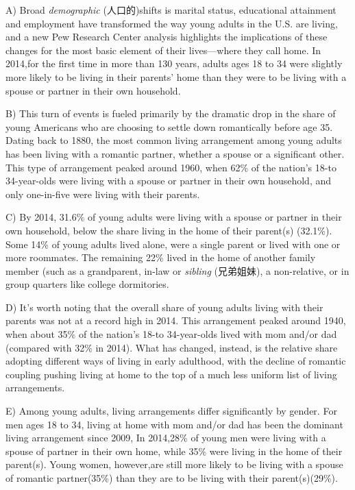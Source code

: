 \documentclass[UTF8,11pt]{ctexart}
\begin{document}
A) Broad\textit{ demographic} (人口的)shifts is marital status, educational attainment and employment have transformed the way young adults in the U.S. are living, and a new Pew Research Center analysis highlights the implications of these changes for the most basic element of their lives—where they call home. In 2014,for the first time in more than 130 years, adults ages 18 to 34 were slightly more likely to be living in their parents’ home than they were to be living with a spouse or partner in their own household.


B) This turn of events is fueled primarily by the dramatic drop in the share of young Americans who are choosing to settle down romantically before age 35. Dating back to 1880, the most common living arrangement among young adults has been living with a romantic partner, whether a spouse or a significant other. This type of arrangement peaked around 1960, when 62\% of the nation’s 18-to 34-year-olds were living with a spouse or partner in their own household, and only one-in-five were living with their parents.


C) By 2014, 31.6\% of young adults were living with a spouse or partner in their own household, below the share living in the home of their parent(s) (32.1\%). Some 14\% of young adults lived alone, were a single parent or lived with one or more roommates. The remaining 22\% lived in the home of another family member (such as a grandparent, in-law or\textit{ sibling} (兄弟姐妹), a non-relative, or in group quarters like college dormitories.


D) It’s worth noting that the overall share of young adults living with their parents was not at a record high in 2014. This arrangement peaked around 1940, when about 35\% of the nation’s 18-to 34-year-olds lived with mom and/or dad (compared with 32\% in 2014). What has changed, instead, is the relative share adopting different ways of living in early adulthood, with the decline of romantic coupling pushing living at home to the top of a much less uniform list of living arrangements.


E) Among young adults, living arrangements differ significantly by gender. For men ages 18 to 34, living at home with mom and/or dad has been the dominant living arrangement since 2009, In 2014,28\% of young men were living with a spouse of partner in their own home, while 35\% were living in the home of their parent(s). Young women, however,are still more likely to be living with a spouse of romantic partner(35\%) than they are to be living with their parent(s)(29\%).
\end{document}
